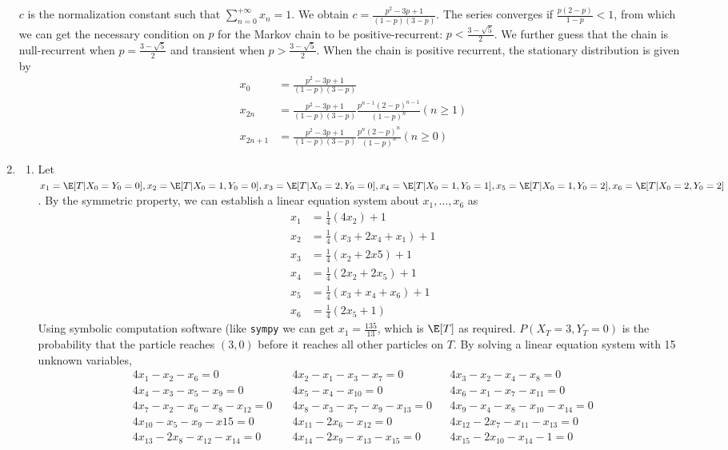 \documentclass{article}
\begin{document}
\begin{enumerate}
$c$ is the normalization constant such that
$\sum_{n=0}^{+\infty} x_n = 1$.
We obtain $c=\frac{p^2-3p+1}{(1-p)(3-p)}$.
The series converges if $\frac{p(2-p)}{1-p} < 1$,
from which we can get the necessary condition on $p$ for
the Markov chain to be positive-recurrent:
$p < \frac{3-\sqrt{5}}{2}$.
We further guess that the chain is null-recurrent
when $p=\frac{3-\sqrt{5}}{2}$
and transient when $p > \frac{3-\sqrt{5}}{2}$.
When the chain is positive recurrent,
the stationary distribution is given by
\begin{align*}
x_0 &=\frac{p^2-3p+1}{(1-p)(3-p)}\\
x_{2n} &= \frac{p^2-3p+1}{(1-p)(3-p)}\frac{p^{n-1} (2-p)^{n-1}}{(1-p)^n} (n\geq 1) \\
x_{2n+1} & = \frac{p^2-3p+1}{(1-p)(3-p)}\frac{p^n (2-p)^n}{(1-p)^n} (n\geq 0)
\end{align*}
\item
\begin{enumerate}[label=(\roman*)]
    \item Let $x_1=\E[T|X_0=Y_0=0],
    x_2=\E[T|X_0=1,Y_0=0],
    x_3=\E[T|X_0=2,Y_0=0],
    x_4=\E[T|X_0=1,Y_0=1],
    x_5=\E[T|X_0=1,Y_0=2],
    x_6=\E[T|X_0=2,Y_0=2]
    $.
    By the symmetric property, we can establish
    a linear equation system about $x_1,\dots, x_6$ as
    \begin{align*}
        x_1 &= \frac{1}{4}(4x_2) + 1\\
        x_2 & = \frac{1}{4}(x_3+2x_4+x_1)+1\\
        x_3 &= \frac{1}{4}(x_2 + 2x5) + 1 \\
        x_4 &=\frac{1}{4} (2x_2 + 2x_5) + 1\\
        x_5 &=\frac{1}{4}(x_3+x_4+x_6) +1\\
        x_6&=\frac{1}{4}(2x_5+1)
        \end{align*}
    Using symbolic computation software (like
    \texttt{sympy} we can get $x_1=\frac{135}{13}$, which is $\E[T]$
    as required.
    $P(X_T=3,Y_T=0)$ is the probability that the
particle reaches $(3,0)$ before it reaches all other particles on $T$. By solving a linear
equation system with 15 unknown variables,
\begin{align*}
                4  x_1 - x_2 - x_6=0 \quad&
             4x_2-x_1 - x_3 -x_7=0 &&
            4x_3-x_2-x_4-x_8 =0\\
            4x_4-x_3-x_5-x_9=0 \quad &
            4x_5-x_4-x_{10}=0&&
            4x_6-x_1-x_7-x_{11}=0\\
            4x_7-x_2-x_6-x_8-x_{12}=0  \quad&
            4x_8-x_3-x_7-x_9-x_{13}=0 &&
            4x_9-x_4-x_8-x_10-x_{14}=0 \\
            4x_{10}-x_5-x_9-x15=0  \quad& 
            4x_{11}-2x_6-x_{12} =0 &&
            4x_{12}-2x_7-x_{11}-x_{13} =0\\
            4 x_{13}-2 x_8-x_{12}-x_{14} =0 \quad&
            4 x_{14}-2 x_9-x_{13}-x_{15} =0&&
            4 x_{15}-2 x_{10}-x_{14}-1=0 \\
\end{align*}


\end{enumerate}
\end{enumerate}
\end{document}
